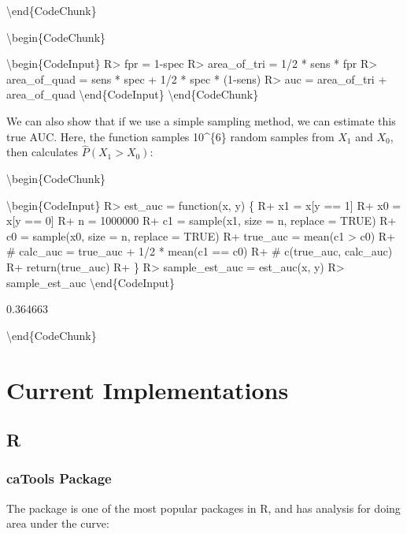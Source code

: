 \documentclass[article]{jss}
\begin{document}
\textbackslash{}end\{CodeChunk\}

\textbackslash{}begin\{CodeChunk\}

\textbackslash{}begin\{CodeInput\} R\textgreater{} fpr = 1-spec
R\textgreater{} area\_of\_tri = 1/2 * sens * fpr R\textgreater{}
area\_of\_quad = sens * spec + 1/2 * spec * (1-sens) R\textgreater{} auc
= area\_of\_tri + area\_of\_quad \textbackslash{}end\{CodeInput\}
\textbackslash{}end\{CodeChunk\}

We can also show that if we use a simple sampling method, we can
estimate this true AUC. Here, the function  samples
10\^{}\{6\} random samples from \(X_{1}\) and \(X_{0}\), then calculates
\(\hat{P}(X_{1} > X_{0})\):

\textbackslash{}begin\{CodeChunk\}

\textbackslash{}begin\{CodeInput\} R\textgreater{} est\_auc =
function(x, y) \{ R+ x1 = x{[}y == 1{]} R+ x0 = x{[}y == 0{]} R+ n =
1000000 R+ c1 = sample(x1, size = n, replace = TRUE) R+ c0 = sample(x0,
size = n, replace = TRUE) R+ true\_auc = mean(c1 \textgreater{} c0) R+
\# calc\_auc = true\_auc + 1/2 * mean(c1 == c0) R+ \# c(true\_auc,
calc\_auc) R+ return(true\_auc) R+ \} R\textgreater{} sample\_est\_auc =
est\_auc(x, y) R\textgreater{} sample\_est\_auc
\textbackslash{}end\{CodeInput\}

\begin{CodeOutput}
[1] 0.364663
\end{CodeOutput}

\textbackslash{}end\{CodeChunk\}

\hypertarget{current-implementations}{%
\section{Current Implementations}\label{current-implementations}}

\hypertarget{r}{%
\subsection{R}\label{r}}

\hypertarget{catools-package}{%
\subsubsection{caTools Package}\label{catools-package}}

The  package is one of the most popular packages in R, and
has analysis for doing area under the curve:
\end{document}
